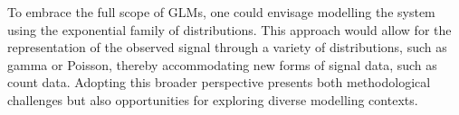 To embrace the full scope of GLMs, one could envisage modelling the system using the exponential family of distributions. This approach would allow for the representation of the observed signal through a variety of distributions, such as gamma or Poisson, thereby accommodating new forms of signal data, such as count data. Adopting this broader perspective presents both methodological challenges but also opportunities for exploring diverse modelling contexts.









